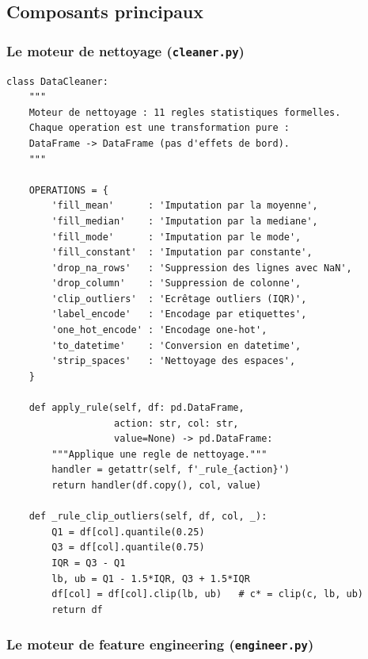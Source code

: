 \documentclass[12pt,a4paper]{article}
\begin{document}
\subsection{Composants principaux}

\subsubsection{Le moteur de nettoyage (\texttt{cleaner.py})}

\begin{lstlisting}[caption={Interface du moteur de nettoyage},
                   label={lst:cleaner}]
class DataCleaner:
    """
    Moteur de nettoyage : 11 regles statistiques formelles.
    Chaque operation est une transformation pure :
    DataFrame -> DataFrame (pas d'effets de bord).
    """

    OPERATIONS = {
        'fill_mean'      : 'Imputation par la moyenne',
        'fill_median'    : 'Imputation par la mediane',
        'fill_mode'      : 'Imputation par le mode',
        'fill_constant'  : 'Imputation par constante',
        'drop_na_rows'   : 'Suppression des lignes avec NaN',
        'drop_column'    : 'Suppression de colonne',
        'clip_outliers'  : 'Ecrêtage outliers (IQR)',
        'label_encode'   : 'Encodage par etiquettes',
        'one_hot_encode' : 'Encodage one-hot',
        'to_datetime'    : 'Conversion en datetime',
        'strip_spaces'   : 'Nettoyage des espaces',
    }

    def apply_rule(self, df: pd.DataFrame,
                   action: str, col: str,
                   value=None) -> pd.DataFrame:
        """Applique une regle de nettoyage."""
        handler = getattr(self, f'_rule_{action}')
        return handler(df.copy(), col, value)

    def _rule_clip_outliers(self, df, col, _):
        Q1 = df[col].quantile(0.25)
        Q3 = df[col].quantile(0.75)
        IQR = Q3 - Q1
        lb, ub = Q1 - 1.5*IQR, Q3 + 1.5*IQR
        df[col] = df[col].clip(lb, ub)   # c* = clip(c, lb, ub)
        return df
\end{lstlisting}

\subsubsection{Le moteur de feature engineering (\texttt{engineer.py})}
\end{document}
